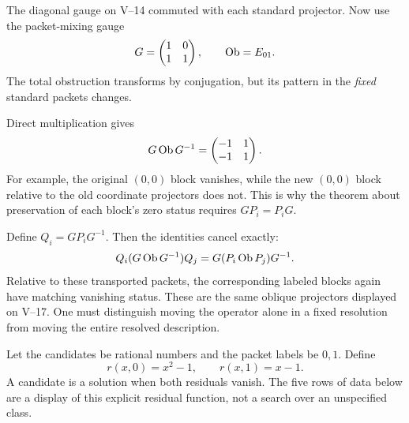 
The diagonal gauge on V--14 commuted with each standard projector. Now use the packet-mixing gauge
\[
G=\begin{pmatrix}1&0\\1&1\end{pmatrix},\qquad \operatorname{Ob}=E_{01}.
\]
The total obstruction transforms by conjugation, but its pattern in the \emph{fixed} standard packets changes.


Direct multiplication gives
\[
G\operatorname{Ob} G^{-1}=\begin{pmatrix}-1&1\\-1&1\end{pmatrix}.
\]
For example, the original $(0,0)$ block vanishes, while the new $(0,0)$ block relative to the old coordinate projectors does not. This is why the theorem about preservation of each block's zero status requires $G P_i=P_iG$.

Define $Q_i=GP_iG^{-1}$. Then the identities cancel exactly:
\[
Q_i(G\operatorname{Ob} G^{-1})Q_j=G(P_i\operatorname{Ob} P_j)G^{-1}.
\]
Relative to these transported packets, the corresponding labeled blocks again have matching vanishing status. These are the same oblique projectors displayed on V--17. One must distinguish moving the operator alone in a fixed resolution from moving the entire resolved description.


Let the candidates be rational numbers and the packet labels be $0,1$. Define
\[
r(x,0)=x^2-1,\qquad r(x,1)=x-1.
\]
A candidate is a solution when both residuals vanish. The five rows of data below are a display of this explicit residual function, not a search over an unspecified class.


